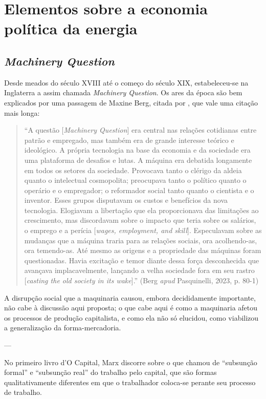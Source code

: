 \chapter{Elementos sobre a economia política da energia}
\section{\textit{Machinery Question}}
Desde meados do século XVIII até o começo do século XIX, estabeleceu-se na Inglaterra a assim chamada \textit{Machinery Question}. Os ares da época são bem explicados por uma passagem de Maxine Berg, citada por \textcite{Pasquinelli2023}, que vale uma citação mais longa:
\begin{quote}
    ``A questão [\textit{Machinery Question}] era central nas relações cotidianas entre patrão e empregado, mas também era de grande interesse teórico e ideológico. A própria tecnologia na base da economia e da sociedade era uma plataforma de desafios e lutas. A máquina era debatida longamente em todos os setores da sociedade. Provocava tanto o clérigo da aldeia quanto o intelectual cosmopolita; preocupava tanto o político quanto o operário e o empregador; o reformador social tanto quanto o cientista e o inventor. Esses grupos disputavam os custos e benefícios da nova tecnologia. Elogiavam a libertação que ela proporcionava das limitações ao crescimento, mas discordavam sobre o impacto que teria sobre os salários, o emprego e a perícia [\textit{wages, employment, and skill}]. Especulavam sobre as mudanças que a máquina traria para as relações sociais, ora acolhendo-as, ora temendo-as. Até mesmo as origens e a propriedade das máquinas foram questionadas. Havia excitação e temor diante dessa força desconhecida que avançava implacavelmente, lançando a velha sociedade fora em seu rastro [\textit{casting the old society in its wake}].'' (Berg \textit{apud} Pasquinelli, 2023, p. 80-1)
\end{quote}

A disrupção social que a maquinaria causou, embora decididamente importante, não cabe à discussão aqui proposta; o que cabe aqui é como a maquinaria afetou os processos de produção capitalista, e como ela não só elucidou, como viabilizou a generalização da forma-mercadoria.

---

No primeiro livro d'O Capital, Marx discorre sobre o que chamou de ``subsunção formal'' e ``subsunção real'' do trabalho pelo capital, que são formas qualitativamente diferentes em que o trabalhador coloca-se perante seu processo de trabalho.

